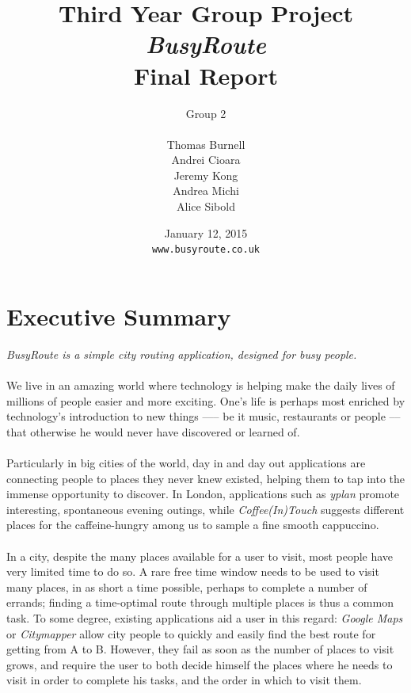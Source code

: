 \documentclass[a4paper, 10pt]{report}
\begin{document}
\title{Third Year Group Project \\ \textit{BusyRoute} \\ Final Report}
\author{Group 2\\\\Thomas Burnell\\Andrei Cioara\\Jeremy Kong\\ Andrea Michi\\Alice Sibold}
\date{January 12, 2015 \\ \texttt{www.busyroute.co.uk}}
\maketitle

\tableofcontents
\chapter{Executive Summary}
\textit{BusyRoute is a simple city routing application, designed for busy people.}\\
\\
We live in an amazing world where technology is helping make the daily lives of millions of people easier and more exciting. One's life is perhaps most enriched by technology's introduction to new things —-- be it music, restaurants or people –-- that otherwise he would never have discovered or learned of.\\
\\
Particularly in big cities of the world, day in and day out applications are connecting people to places they never knew existed, helping them to tap into the immense opportunity to discover. In London, applications such as \textit{yplan} \cite{yplan} promote interesting, spontaneous evening outings, while \textit{Coffee(In)Touch} \cite{coffee-in-touch} suggests different places for the caffeine-hungry among us to sample a fine smooth cappuccino.\\
\\
In a city, despite the many places available for a user to visit, most people have very limited time to do so. A rare free time window needs to be used to visit many places, in as short a time possible, perhaps to complete a number of errands; finding a time-optimal route through multiple places is thus a common task. To some degree, existing applications aid a user in this regard: \textit{Google Maps} \cite{google-maps} or \textit{Citymapper} \cite{citymapper} allow city people to quickly and easily find the best route for getting from A to B. However, they fail as soon as the number of places to visit grows, and require the user to both decide himself the places where he needs to visit in order to complete his tasks, and the order in which to visit them.\\
\end{document}
